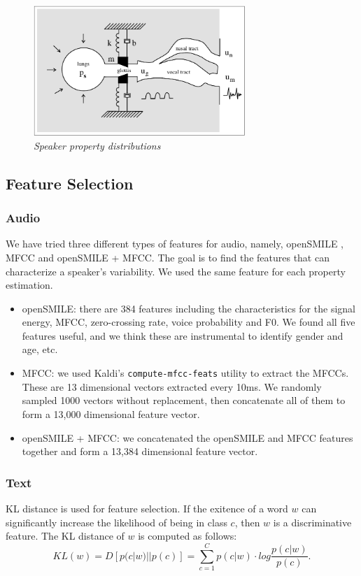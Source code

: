 \documentclass[a4paper]{article}
\begin{document}
\begin{figure}[t]
\centerline{\includegraphics[width=80mm]{figure}}
\caption{{\it Speaker property distributions}}  
\label{dists}
\end{figure}

\subsection{Feature Selection}
\subsubsection{Audio}
We have tried three different types of features for audio, namely, openSMILE \cite{eyben}, MFCC and openSMILE + MFCC. The goal is to find the features that can characterize a speaker's variability. We used the same feature for each property estimation.

\begin{itemize}
\item openSMILE: there are 384 features including the characteristics for the signal energy, MFCC, zero-crossing rate, voice probability and F0. We found all five features useful, and we think these are instrumental to identify gender and age, etc.

\item MFCC: we used Kaldi's \cite{povey} \texttt{compute-mfcc-feats} utility to extract the MFCCs. These are 13 dimensional vectors extracted every 10ms. We randomly sampled 1000 vectors without replacement, then concatenate all of them to form a 13,000 dimensional feature vector.

\item openSMILE + MFCC: we concatenated the openSMILE and MFCC features together and form a 13,384 dimensional feature vector.
\end{itemize}

\subsubsection{Text}
KL distance is used for feature selection. If the exitence of a word $w$ can significantly increase the likelihood of being in class $c$, then $w$ is a discriminative feature. The KL distance of $w$ is computed as follows:
\begin{equation}
  KL(w) = D[p(c|w)||p(c)] = \sum_{c=1}^{C}p(c|w)\cdot log\frac{p(c|w)}{p(c)}.
\label{kl}
\end{equation}
\end{document}
